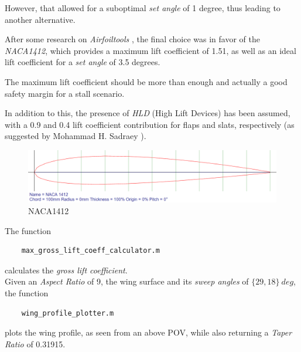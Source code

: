 \documentclass{article}
\begin{document}
However, that allowed for a suboptimal \textit{set angle} of 1 degree, thus leading to another alternative.

After some research on \textit{Airfoiltools} \autocite{Airfoiltools}, the final choice was in favor
of the \textit{NACA1412}, which provides a maximum lift coefficient of 1.51, as well as an ideal lift coefficient
for a \textit{set angle} of 3.5 degrees.

The maximum lift coefficient should be more than enough and actually a good safety margin 
for a stall scenario.

In addition to this, the presence of \textit{HLD} (High Lift Devices) has been assumed, with 
a 0.9 and 0.4 lift coefficient contribution for flaps and slats, respectively (as suggested by Mohammad H. Sadraey \autocite{Sadraey_Mohammad}).\\ 

\begin{figure}[h!]
    \centering
    \includegraphics[width=\textwidth]{Sources/Plots_and_Pictures/NACA1412.png}
    \caption{NACA1412}
    \label{NACA1412}
\end{figure}
\clearpage

The function \autocite{Airbus_replacement_repo} 
\begin{verbatim}
    max_gross_lift_coeff_calculator.m
\end{verbatim}
calculates the \textit{gross lift coefficient}.\\

Given an \textit{Aspect Ratio} of 9, the wing surface and its \textit{sweep angles} of $ \{29, 18 \} \ deg$,
the function 
\begin{verbatim}
    wing_profile_plotter.m
\end{verbatim}
plots the wing profile, as seen from an above POV, while also returning a \textit{Taper Ratio} of 0.31915.\\ 
\end{document}
